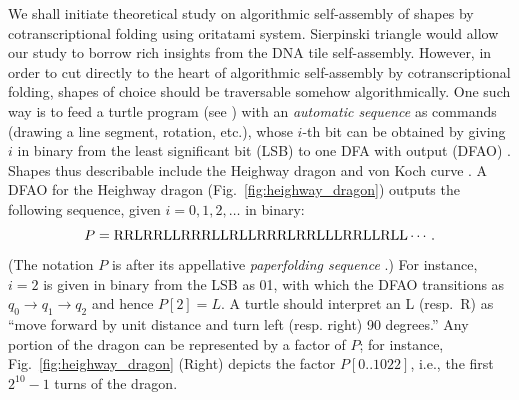 We shall initiate theoretical study on algorithmic self-assembly of shapes by cotranscriptional folding using oritatami system. 
Sierpinski triangle would allow our study to borrow rich insights from the DNA tile self-assembly. 
However, in order to cut directly to the heart of algorithmic self-assembly by cotranscriptional folding, shapes of choice should be traversable somehow algorithmically. 
One such way is to feed a turtle program (see \cite{AbelsondiSessa1981}) with an \textit{automatic sequence} as commands (drawing a line segment, rotation, etc.), whose $i$-th bit can be obtained by giving $i$ in binary from the least significant bit (LSB) to one DFA with output (DFAO) \cite{AlloucheShallit2003}.
Shapes thus describable include the Heighway dragon \cite{AlloucheShallit2003} and von Koch curve \cite{MaHoldener2005}. 
A DFAO for the Heighway dragon (Fig.~\ref{fig:heighway_dragon}) outputs the following sequence, given $i = 0, 1, 2, \ldots$ in binary: 
\[
P 	= {\rm RRLRRLLRRRLLRLLRRRLRRLLLRRLLRLL} \cdots.
\]
(The notation $P$ is after its appellative \textit{paperfolding sequence} \cite{AlloucheShallit2003}.) 
For instance, $i = 2$ is given in binary from the LSB as 01, with which the DFAO transitions as $q_0 \to q_1 \to q_2$ and hence $P[2] = L$. 
A turtle should interpret an L (resp.~R) as ``move forward by unit distance and turn left (resp. right) 90 degrees.''
Any portion of the dragon can be represented by a factor of $P$; for instance, Fig.~\ref{fig:heighway_dragon} (Right) depicts the factor $P[0 .. 1022]$, i.e., the first $2^{10}-1$ turns of the dragon. 

